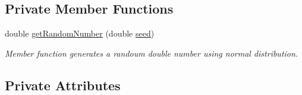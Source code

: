 \subsection*{Private Member Functions}
\begin{DoxyCompactItemize}
\item 
double \hyperlink{classRanger_ac2eb58a7ddd097583a46c3c6a1d30c8f}{get\+Random\+Number} (double \hyperlink{main_8cpp_a1447ad288a0a73454510f5777bdc3ed1}{seed})
\begin{DoxyCompactList}\small\item\em Member function generates a randoum double number using normal distribution. \end{DoxyCompactList}\end{DoxyCompactItemize}
\subsection*{Private Attributes}
